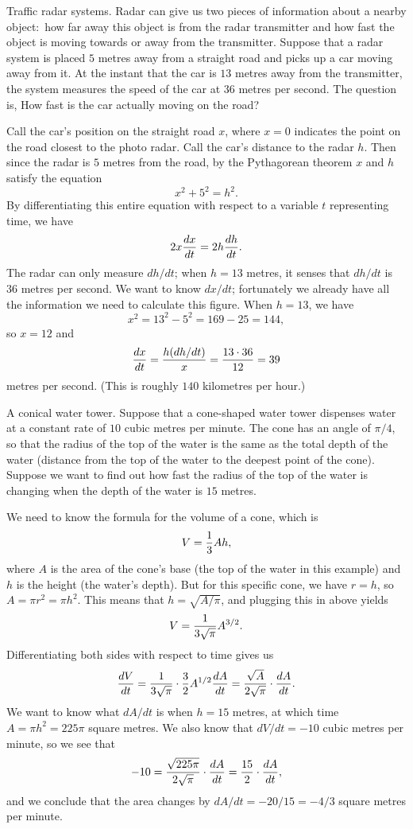\medskip\boldlabel Traffic radar systems.
Radar can give us two pieces of information about a nearby object:~how far away this object is from the
radar transmitter and how fast the object is moving towards or away from the transmitter.
Suppose that a radar system is placed $5$ metres away from a straight road and picks up a car moving away
from it. At the instant that the car is $13$ metres away from the transmitter, the system measures the
speed of the car at $36$ metres per second. The question is, How fast is the car actually moving on the road?

Call the car's position on the straight road $x$, where $x=0$ indicates the point on the road closest to the
photo radar. Call the car's distance to the radar $h$. Then since the radar is $5$ metres from the road,
by the Pythagorean theorem $x$ and $h$ satisfy the equation
$$x^2 + 5^2 = h^2.$$
By differentiating this entire equation with respect to a variable $t$ representing time, we have
$$2x{dx\over dt} = 2h{dh\over dt}.$$
The radar can only measure $dh/dt$; when $h=13$ metres, it senses that $dh/dt$ is $36$ metres per second.
We want to know $dx/dt$; fortunately we already have all the information we need to calculate this figure.
When $h=13$, we have
$$x^2 = 13^2 - 5^2 = 169-25 = 144,$$
so $x = 12$ and
$${dx\over dt} = {h(dh/dt) \over x} = {13\cdot 36\over 12} = 39$$
metres per second. (This is roughly $140$ kilometres per hour.)

\medskip\boldlabel A conical water tower. Suppose that a cone-shaped water tower dispenses water at a constant
rate of $10$ cubic metres per minute. The cone has an angle of $\pi/4$, so
that the radius of the top of the water is the same as the total depth of the water (distance from
the top of the water to the deepest point of the cone). Suppose we want to find out how fast the radius
of the top of the water is changing when the depth of the water is $15$ metres.

We need to know the formula for the volume of a cone, which is
$$V = {1\over 3} A h,$$
where $A$ is the area of the cone's base (the top of the water in this example) and $h$ is the height
(the water's depth). But for this specific cone, we have $r=h$, so $A = \pi r^2 = \pi h^2$. This means
that $h = \sqrt{A/\pi}$, and plugging this in above yields
$$V = {1\over 3\sqrt\pi} A^{3/2}.$$
Differentiating both sides with respect to time gives us
$${dV\over dt} = {1\over 3\sqrt\pi} \cdot  {3\over 2} A^{1/2} {dA\over dt} = {\sqrt A\over 2\sqrt\pi}
\cdot {dA\over dt}.$$
We want to know what $dA/dt$ is when $h=15$ metres, at which time $A = \pi h^2 = 225\pi$ square metres.
We also know that
$dV/dt = -10$ cubic metres per minute, so we see that
$$-10 = {\sqrt{225\pi} \over 2\sqrt\pi}\cdot {dA\over dt} = {15\over 2}\cdot {dA\over dt},$$
and we conclude that the area changes by $dA/dt = -20/15 = -4/3$ square metres per minute.

